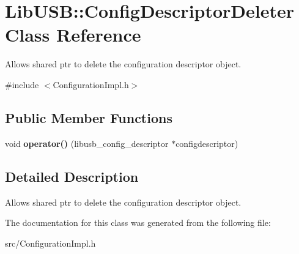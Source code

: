 \hypertarget{class_lib_u_s_b_1_1_config_descriptor_deleter}{\section{Lib\-U\-S\-B\-:\-:Config\-Descriptor\-Deleter Class Reference}
\label{class_lib_u_s_b_1_1_config_descriptor_deleter}
}


Allows shared ptr to delete the configuration descriptor object.  




{\ttfamily \#include $<$Configuration\-Impl.\-h$>$}

\subsection*{Public Member Functions}
\begin{DoxyCompactItemize}
\item 
\hypertarget{class_lib_u_s_b_1_1_config_descriptor_deleter_a4ee1ae5e69ad43a7be8ee7566a80f0cf}{void {\bfseries operator()} (libusb\-\_\-config\-\_\-descriptor $\ast$configdescriptor)}\label{class_lib_u_s_b_1_1_config_descriptor_deleter_a4ee1ae5e69ad43a7be8ee7566a80f0cf}

\end{DoxyCompactItemize}


\subsection{Detailed Description}
Allows shared ptr to delete the configuration descriptor object. 

The documentation for this class was generated from the following file\-:\begin{DoxyCompactItemize}
\item 
src/Configuration\-Impl.\-h\end{DoxyCompactItemize}
